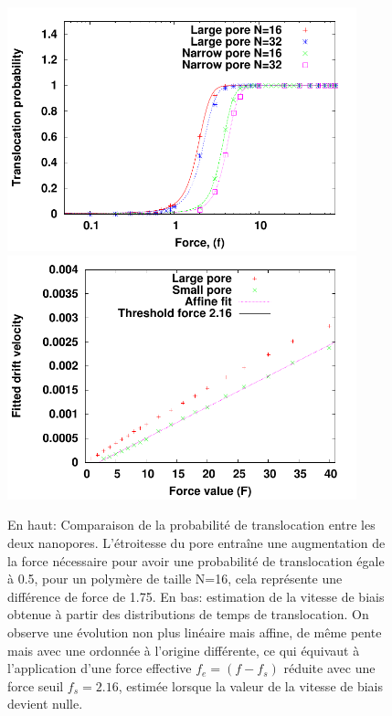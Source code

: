 \begin{figure}[H]
\begin{center}
\includegraphics[width=0.9\textwidth]{probatransloccomppores.pdf} 
\includegraphics[width=0.9\textwidth]{structuredporesfirction.pdf} 
\caption[Différences de friction et de probabilité de translocations entre les pores]{En haut: Comparaison de la probabilité de translocation entre les deux nanopores. L'étroitesse du pore entraîne une augmentation de la force nécessaire pour avoir une probabilité de translocation égale à 0.5, pour un polymère de taille N=16, cela représente une différence de force de 1.75. En bas: estimation de la vitesse de biais obtenue à partir des distributions de temps de translocation. On observe une évolution non plus linéaire mais affine, de même pente mais avec une ordonnée à l’origine différente, ce qui équivaut à l'application d'une force effective $f_e=(f-f_s)$ réduite avec une force seuil $f_s =2.16$, estimée lorsque la valeur de la vitesse de biais devient nulle.}
\label{compporesizeprobafriction}
\end{center}
\end{figure}

